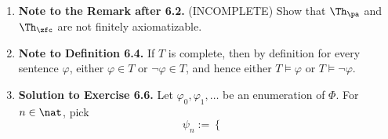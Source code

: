 \begin{enumerate}[1.]
\begin{proof}
If $S$ is itself relational, then the claim trivially holds. Thus, we shall assume that $S$ is not relational.\bigskip\\
Assuming the hypothesis, it suffices to prove the nontrivial direction: $\consqn{(\relational{\Psi})} \subset \relational{\Psi}$. We prove it in two steps below.\bigskip\\
First, we have\smallskip\\
\begin{bquoteno}{60ex}{($\ast$)}
for every $\relational{S}$-sentence $\varphi$: if $\relational{\Psi} \models \varphi$, then $\Psi \models \invrelational{\varphi}$.
\end{bquoteno}\smallskip\\
This can be argued: Suppose $\relational{\Psi} \models \varphi$ and $\struct{A}$ is an $S$-structure with $\struct{A} \models \Psi$. By  we obtain $\relational{\struct{A}} \models \relational{\Psi}$; so $\relational{\struct{A}} \models \varphi$ by premise. Using , we further get $\struct{A} \models \invrelational{\varphi}$. It follows that $\Psi \models \invrelational{\varphi}$.\bigskip\\
Then, we conclude by showing\smallskip\\
\centerline{for every $\relational{S}$-sentence $\varphi$: if $\varphi \in \consqn{(\relational{\Psi})}$, then $\varphi \in \relational{\Psi}$.}\smallskip\\
Suppose $\varphi \in \consqn{(\relational{\Psi})}$, i.e.\ $\relational{\Psi} \models \varphi$. By ($\ast$) we have $\Psi \models \invrelational{\varphi}$ and hence $\invrelational{\varphi} \in \Psi$ because $\consqn{\Psi} = \Psi$. It follows that $\varphi \in \relational{\Psi}$ (note that $\relational{(\invrelational{\varphi})} = \varphi$ because $\invrelational{\varphi}$ is already term-reduced, cf.\ ).
\end{proof}
%
\item \textbf{Note to the Remark after 6.2.} (INCOMPLETE) Show that $\Th_\pa$ and $\Th_\zfc$ are not finitely axiomatizable.
%
\item \textbf{Note to Definition 6.4.} If $T$ is complete, then by definition for every sentence $\varphi$, either $\varphi \in T$ or $\neg\varphi \in T$, and hence either $T \models \varphi$ or $T \models \neg\varphi$.
%
\item \textbf{Solution to Exercise 6.6.} Let $\varphi_0, \varphi_1, \ldots$ be an enumeration of $\Phi$. For $n \in \nat$, pick
\[
\psi_n := \begin{cases}

\end{cases}\]
\end{enumerate}
